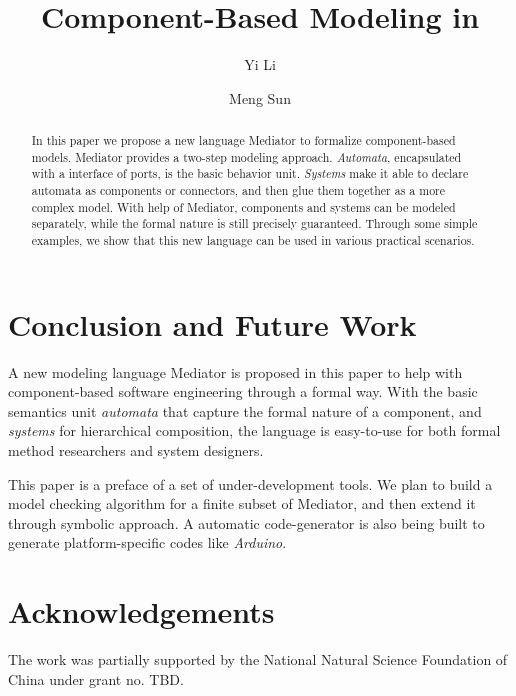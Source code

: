 \documentclass{llncs}
\title{Component-Based Modeling in \lang{}}
\author{Yi Li\and Meng Sun}
\institute{LMAM and Department of Informatics, School of Mathematical Sciences, Peking University, Beijing, China \\
\email{liyi\_math@pku.edu.cn, sunmeng@math.pku.edu.cn}
}
\newcommand{\lang}[0]{Mediator}
\begin{document}
\maketitle

\begin{abstract}
In this paper we propose a new language \lang{} to formalize component-based models. \lang{} provides a two-step modeling approach. \emph{Automata}, encapsulated with a interface of ports, is the basic behavior unit. \emph{Systems} make it able to declare automata as components or connectors, and then glue them together as a more complex model. With help of \lang{}, components and systems can be modeled separately, while the formal nature is still precisely guaranteed. Through some simple examples, we show that this new language can be used in various practical scenarios.
\end{abstract}


% 




\section{Conclusion and Future Work}
\label{sec:conclusion}

A new modeling language \lang{} is proposed in this paper to help with component-based software engineering through a formal way. With the basic semantics unit \emph{automata} that capture the formal nature of a component, and \emph{systems} for hierarchical composition, the language is easy-to-use for both formal method researchers and system designers.

This paper is a preface of a set of under-development tools. We plan to build a model checking algorithm for a finite subset of \lang{}, and then extend it through symbolic approach. A automatic code-generator is also being built to generate platform-specific codes like \emph{Arduino}.

\section*{Acknowledgements}

The work was partially supported by the National Natural Science Foundation of China under grant no. TBD.




\newpage

\end{document}
